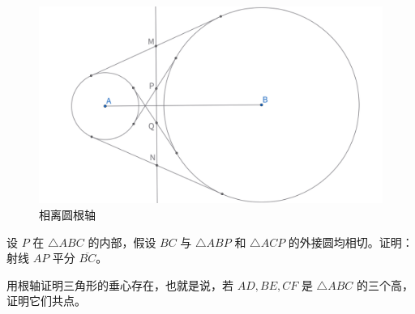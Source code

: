 \begin{figure}[H]
\begin{minipage}[t]{0.3\textwidth}
    \centering
    \includegraphics[width=\linewidth]{figures/相离圆根轴.png}
    \caption{相离圆根轴}
    \end{minipage}
\end{figure}


\begin{exercise}
    设 $P$ 在 $\triangle ABC$ 的内部，假设 $BC$ 与 $\triangle ABP$ 和 $\triangle ACP$ 的外接圆均相切。证明：射线 $AP$ 平分 $\overline{BC}$。
\end{exercise}

\begin{exercise}
    用根轴证明三角形的垂心存在，也就是说，若 $AD, BE, CF$ 是 $\triangle ABC$ 的三个高，证明它们共点。
\end{exercise}



\newpage 
